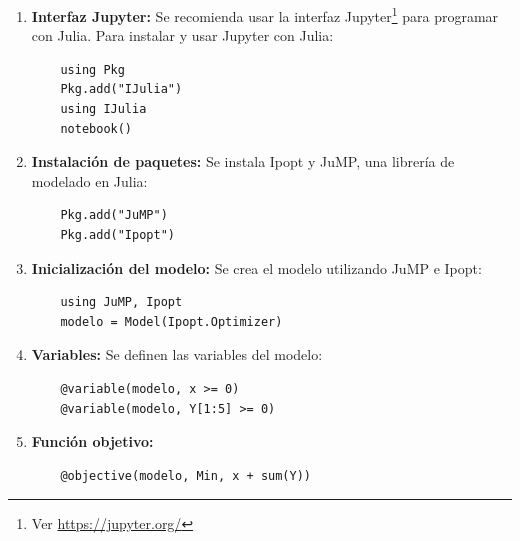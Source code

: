 \begin{enumerate}
    \item \textbf{Interfaz Jupyter:} Se recomienda usar la interfaz Jupyter\footnote{Ver \url{https://jupyter.org/}} para programar con Julia. Para instalar y usar Jupyter con Julia:

    \begin{footnotesize}
    \begin{lstlisting}
    using Pkg
    Pkg.add("IJulia")
    using IJulia
    notebook()
    \end{lstlisting}
    \end{footnotesize}
    
    \item \textbf{Instalación de paquetes:} Se instala Ipopt y JuMP, una librería de modelado en Julia:

    \begin{footnotesize}
    \begin{lstlisting}
    Pkg.add("JuMP")
    Pkg.add("Ipopt")
    \end{lstlisting}
    \end{footnotesize}
    
    \item \textbf{Inicialización del modelo:} Se crea el modelo utilizando JuMP e Ipopt:

    \begin{footnotesize}
    \begin{lstlisting}
    using JuMP, Ipopt
    modelo = Model(Ipopt.Optimizer)
    \end{lstlisting}
    \end{footnotesize}
    
    \item \textbf{Variables:} Se definen las variables del modelo:

    \begin{footnotesize}
    \begin{lstlisting}
    @variable(modelo, x >= 0)
    @variable(modelo, Y[1:5] >= 0)
    \end{lstlisting}
    \end{footnotesize}
    
    \item \textbf{Función objetivo:}

    \begin{footnotesize}
    \begin{lstlisting}
    @objective(modelo, Min, x + sum(Y))
    \end{lstlisting}
    \end{footnotesize}
    

\end{enumerate}
